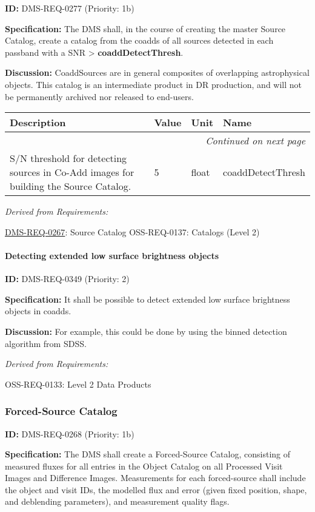 \documentclass[SE,toc,lsstdraft]{lsstdoc}
\makeatletter
\newcommand{\paramname}[1]{\hspace{0pt}#1}
\newcommand{\unitname}[1]{\hspace{0pt}#1}
\newenvironment{parameters}[0]{%
\setlength\LTleft{0pt}
\setlength\LTright{\fill}
\begin{small}
\begin{longtable}[]{|p{0.49\textwidth}|l|p{0.6in}|p{1.70in}@{}|}

\hline \textbf{Description} & \textbf{Value} & \textbf{Unit} & \textbf{Name} \\ \hline
\endhead

\hline \multicolumn{4}{r}{\emph{Continued on next page}} \\
\endfoot

\hline\hline
\endlastfoot
}{%
\hline
\end{longtable}
\end{small}
}
\makeatother
\begin{document}
\label{DMS-REQ-0277}
\textbf{ID:} DMS-REQ-0277 (Priority: 1b)

\textbf{Specification:} The DMS shall, in the course of creating the master Source Catalog, create a catalog from the coadds of all sources detected in each passband with a SNR > \textbf{coaddDetectThresh}.

\textbf{Discussion: }CoaddSources are in general composites of overlapping astrophysical objects. This catalog is an intermediate product in DR production, and will not be permanently archived nor released to end-users.

\begin{parameters}
S/N threshold for detecting sources in Co-Add images for building the Source Catalog.
&
5
&
\unitname{%
float
}
&
\paramname{%
coaddDetectThresh
} \\\hline
\end{parameters}

\emph{Derived from Requirements:}

\hyperref[DMS-REQ-0267]{DMS-REQ-0267}:
Source Catalog \newline
OSS-REQ-0137:
Catalogs (Level 2) \newline

\paragraph{Detecting extended  low surface brightness objects}\hfill  %

\label{DMS-REQ-0349}
\textbf{ID:} DMS-REQ-0349 (Priority: 2)

\textbf{Specification: }It shall be possible to detect extended low surface brightness objects in coadds.

\textbf{Discussion: }For example, this could be done by using the binned detection algorithm from SDSS.

\emph{Derived from Requirements:}

OSS-REQ-0133:
Level 2 Data Products \newline

\subsubsection{Forced-Source Catalog}

\label{DMS-REQ-0268}
\textbf{ID:} DMS-REQ-0268 (Priority: 1b)

\textbf{Specification:} The DMS shall create a Forced-Source Catalog, consisting of measured fluxes for all entries in the Object Catalog on all Processed Visit Images and Difference Images. Measurements for each forced-source shall include the object and visit IDs, the modelled flux and error (given fixed position, shape, and deblending parameters), and measurement quality flags.
\end{document}
